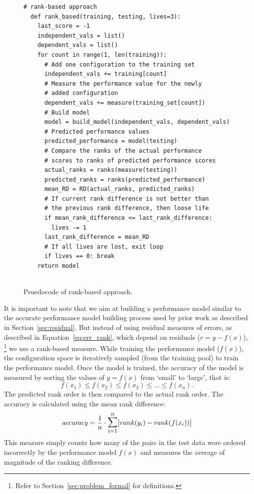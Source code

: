 \begin{figure}[t]
\small
\hspace{0.4cm}\begin{lstlisting}[xrightmargin=5.0ex,mathescape,frame=none,numbers=right]
  # rank-based approach
  def rank_based(training, testing, lives=3): 
    last_score = -1
    independent_vals = list()
    dependent_vals = list()
    for count in range(1, len(training)):    
      # Add one configuration to the training set
      independent_vals += training[count]      
      # Measure the performance value for the newly
      # added configuration 
      dependent_vals += measure(training_set[count])
      # Build model
      model = build_model(independent_vals, dependent_vals)     
      # Predicted performance values
      predicted_performance = model(testing) 
      # Compare the ranks of the actual performance 
      # scores to ranks of predicted performance scores
      actual_ranks = ranks(measure(testing))
      predicted_ranks = ranks(predicted_performance)
      mean_RD = RD(actual_ranks, predicted_ranks)
      # If current rank difference is not better than
      # the previous rank difference, then loose life
      if mean_rank_difference <= last_rank_difference:
        lives -= 1
      last_rank_difference = mean_RD
      # If all lives are lost, exit loop
      if lives == 0: break
    return model
      

\end{lstlisting}
\caption{\small{Psuedocode of rank-based approach.}
}
\label{fig:rank-based}  
\end{figure}
It is important to note that we aim at building a performance model similar to the accurate performance model building process used by prior work as described in Section~\ref{sec:residual}. But instead of using residual measures of errors, as described in Equation~\ref{eq:err_rank}, which depend on residuals ($r = y - f(x)$), \footnote{Refer to Section~\ref{sec:problem_formal} for definitions.} we use a rank-based measure. While training the performance model ($f(x)$), the configuration space is iteratively sampled (from the training pool) to train the performance model. Once the model is trained, the accuracy of the model is measured  by sorting the values of $y=f(x)$ from `small' to `large', that is:
\begin{equation}
    f(x_1) \le f(x_2) \le f(x_3) \le ... \le f(x_n).
\end{equation}
The predicted rank order is then compared to the actual rank order. The accuracy is calculated using the mean rank difference:
\begin{equation} \label{eq:rank_performance}
    \mathit{accuracy} = \frac{1}{n} \cdot \mathlarger{\mathlarger{\sum}}_{i=1}^{n}\abs{rank(y_i) - rank(f(x_i))}
\end{equation}
This measure simply counts how many of the pairs in the test data were ordered incorrectly by the performance model $f(x)$ and measures the average of magnitude of the ranking difference. 




